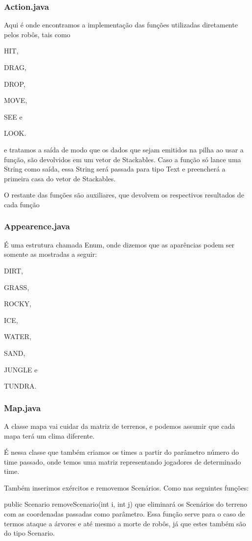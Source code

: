 \documentclass[a4paper]{article}
\begin{document}
		\subsubsection{ Action.java }
		    Aqui é onde encontramos a implementação das funções
		    utilizadas diretamente pelos robôs, tais como 
		    {\textcolor{NavyBlue}{HIT},
		    {\textcolor{NavyBlue}{DRAG},
		    {\textcolor{NavyBlue}{DROP},
		    {\textcolor{NavyBlue}{MOVE},
		    {\textcolor{NavyBlue}{SEE} e 
		    {\textcolor{NavyBlue}{LOOK}.
		    
		    e tratamos a saída de modo que os dados que sejam 
		    emitidos na pilha ao usar a função, são devolvidos em
		    um vetor de Stackables. 
		    Caso a função só lance uma String como saída, essa 
		    String será passada para tipo Text e preencherá a 
		    primeira casa do vetor de Stackables.
		    
		    O restante das funções são auxiliares, que devolvem
		    os respectivos resultados de cada função
		    
		\subsubsection{ Appearence.java }
		    É uma estrutura chamada Enum, onde dizemos que as
		    aparências podem ser somente as mostradas a seguir:
		    {\textcolor{NavyBlue}{DIRT},
            {\textcolor{NavyBlue}{GRASS},
            {\textcolor{NavyBlue}{ROCKY},
            {\textcolor{NavyBlue}{ICE},
            {\textcolor{NavyBlue}{WATER},
            {\textcolor{NavyBlue}{SAND},
            {\textcolor{NavyBlue}{JUNGLE} e
            {\textcolor{NavyBlue}{TUNDRA}.
		
		\subsubsection{ Map.java }
		    A classe mapa vai cuidar da matriz de terrenos, e 
		    podemos assumir que cada mapa terá um clima diferente.
		    
		    É nessa classe que também criamos os times a partir
		    do parâmetro número do time passado, onde temos uma 
		    matriz representando jogadores de determinado time.
		    
		    Também inserimos exércitos e removemos Scenários.
		    Como nas seguintes funções:
		    
		    {\textcolor{NavyBlue}{public Scenario
		    removeScenario(int i, int j)}
		    que eliminará os Scenários do terreno com as coordenadas
		    passadas como parâmetro. Essa função serve para o caso 
		    de termos ataque a árvores e até mesmo a morte de robôs,
		    já que estes também são do tipo Scenario.
		    
}}}}}}}}}}}}}}}
\end{document}
